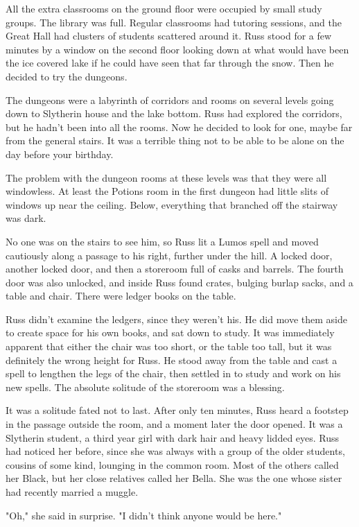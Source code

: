 All the extra classrooms on the ground floor were occupied by small study groups. The library was full. Regular classrooms had tutoring sessions, and the Great Hall had clusters of students scattered around it. Russ stood for a few minutes by a window on the second floor looking down at what would have been the ice covered lake if he could have seen that far through the snow. Then he decided to try the dungeons.

The dungeons were a labyrinth of corridors and rooms on several levels going down to Slytherin house and the lake bottom. Russ had explored the corridors, but he hadn't been into all the rooms. Now he decided to look for one, maybe far from the general stairs. It was a terrible thing not to be able to be alone on the day before your birthday.

The problem with the dungeon rooms at these levels was that they were all windowless. At least the Potions room in the first dungeon had little slits of windows up near the ceiling. Below, everything that branched off the stairway was dark.

No one was on the stairs to see him, so Russ lit a Lumos spell and moved cautiously along a passage to his right, further under the hill. A locked door, another locked door, and then a storeroom full of casks and barrels. The fourth door was also unlocked, and inside Russ found crates, bulging burlap sacks, and a table and chair. There were ledger books on the table.

Russ didn't examine the ledgers, since they weren't his. He did move them aside to create space for his own books, and sat down to study. It was immediately apparent that either the chair was too short, or the table too tall, but it was definitely the wrong height for Russ. He stood away from the table and cast a spell to lengthen the legs of the chair, then settled in to study and work on his new spells. The absolute solitude of the storeroom was a blessing.

It was a solitude fated not to last. After only ten minutes, Russ heard a footstep in the passage outside the room, and a moment later the door opened. It was a Slytherin student, a third year girl with dark hair and heavy lidded eyes. Russ had noticed her before, since she was always with a group of the older students, cousins of some kind, lounging in the common room. Most of the others called her Black, but her close relatives called her Bella. She was the one whose sister had recently married a muggle.

"Oh," she said in surprise. "I didn't think anyone would be here."

